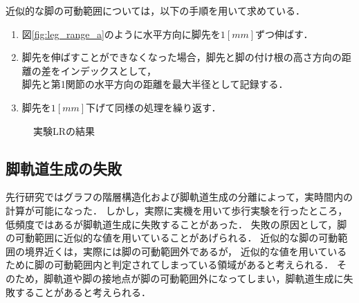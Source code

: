 近似的な脚の可動範囲については，以下の手順を用いて求めている．
\begin{enumerate}
  \item 図\ref{fig:leg_range_a}のように水平方向に脚先を$1 [mm]$ずつ伸ばす．
  \item 脚先を伸ばすことができなくなった場合，脚先と脚の付け根の高さ方向の距離の差をインデックスとして，\\
        脚先と第1関節の水平方向の距離を最大半径として記録する．
  \item 脚先を$1 [mm]$下げて同様の処理を繰り返す．
\end{enumerate}


\begin{figure}[h]
    \label{fig:leg_range_a}
    \caption{実験LRの結果}
    \label{fig:leg_range}
\end{figure}


\subsection{脚軌道生成の失敗}
先行研究ではグラフの階層構造化および脚軌道生成の分離によって，実時間内の計算が可能になった．
しかし，実際に実機を用いて歩行実験を行ったところ，低頻度ではあるが脚軌道生成に失敗することがあった．
失敗の原因として，脚の可動範囲に近似的な値を用いていることがあげられる．
近似的な脚の可動範囲の境界近くは，実際には脚の可動範囲外であるが，
近似的な値を用いているために脚の可動範囲内と判定されてしまっている領域があると考えられる．
そのため，脚軌道や脚の接地点が脚の可動範囲外になってしまい，脚軌道生成に失敗することがあると考えられる．


